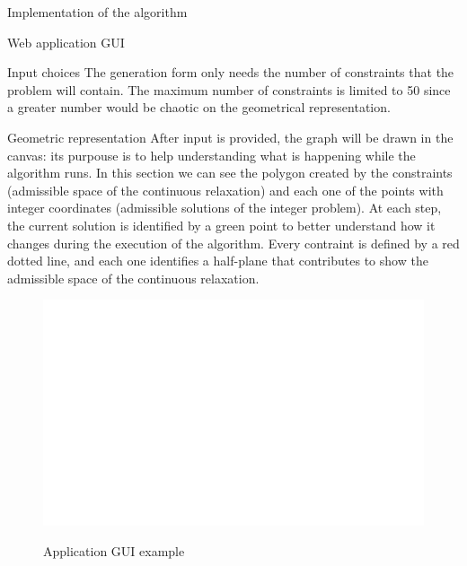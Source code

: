 \documentclass[9pt]{extarticle}
\begin{document}
\begin{section}{Implementation of the algorithm}
\begin{subsection}{Web application GUI}
\begin{subsubsection}{Input choices}
                The generation form only needs the number of constraints that the problem will contain.
                The maximum number of constraints is limited to 50 since a greater number would be chaotic on the geometrical representation.
            \end{subsubsection}

            \begin{subsubsection}{Geometric representation}
                After input is provided, the graph will be drawn in the canvas: its purpouse is to help understanding what is happening while the 
                algorithm runs.
                In this section we can see the polygon created by the constraints (admissible space of the continuous relaxation) and each one of the 
                points with integer coordinates (admissible solutions of the integer problem).
                At each step, the current solution is identified by a green point to better understand how it changes during the execution of the
                algorithm.
                Every contraint is defined by a red dotted line, and each one identifies a half-plane that contributes to show the admissible space
                of the continuous relaxation.
            \end{subsubsection}
            
            \begin{figure}[h]
                \includegraphics[scale=0.3]{gui2.png}
                \centering
                \begin{description}
                    \centering
                    \item[Figure 4] Application GUI example
                \end{description}
            \end{figure}


\end{subsection}
\end{section}
\end{document}

